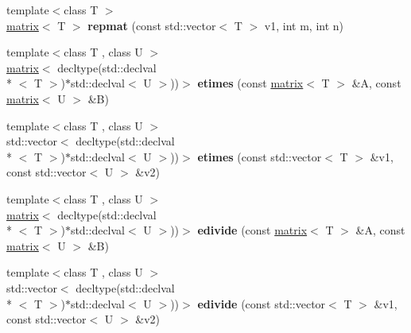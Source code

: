 \begin{DoxyCompactItemize}
\item 
\hypertarget{namespacekeycpp_a59fbea40dfc2d43cd338812f06c4f064}{{\footnotesize template$<$class T $>$ }\\\hyperlink{classkeycpp_1_1matrix}{matrix}$<$ T $>$ {\bfseries repmat} (const std\-::vector$<$ T $>$ v1, int m, int n)}\label{namespacekeycpp_a59fbea40dfc2d43cd338812f06c4f064}

\item 
\hypertarget{namespacekeycpp_a8272f1a2a2ecafa66bec7f1b3409d125}{{\footnotesize template$<$class T , class U $>$ }\\\hyperlink{classkeycpp_1_1matrix}{matrix}$<$ decltype(std\-::declval\\*
$<$ T $>$)$\ast$std\-::declval$<$ U $>$))$>$ {\bfseries etimes} (const \hyperlink{classkeycpp_1_1matrix}{matrix}$<$ T $>$ \&A, const \hyperlink{classkeycpp_1_1matrix}{matrix}$<$ U $>$ \&B)}\label{namespacekeycpp_a8272f1a2a2ecafa66bec7f1b3409d125}

\item 
\hypertarget{namespacekeycpp_a2d684d6c9ad5529ad7cb5437e1828fe2}{{\footnotesize template$<$class T , class U $>$ }\\std\-::vector$<$ decltype(std\-::declval\\*
$<$ T $>$)$\ast$std\-::declval$<$ U $>$))$>$ {\bfseries etimes} (const std\-::vector$<$ T $>$ \&v1, const std\-::vector$<$ U $>$ \&v2)}\label{namespacekeycpp_a2d684d6c9ad5529ad7cb5437e1828fe2}

\item 
\hypertarget{namespacekeycpp_aaa691889ea888335ae1f23c562dde80a}{{\footnotesize template$<$class T , class U $>$ }\\\hyperlink{classkeycpp_1_1matrix}{matrix}$<$ decltype(std\-::declval\\*
$<$ T $>$)$\ast$std\-::declval$<$ U $>$))$>$ {\bfseries edivide} (const \hyperlink{classkeycpp_1_1matrix}{matrix}$<$ T $>$ \&A, const \hyperlink{classkeycpp_1_1matrix}{matrix}$<$ U $>$ \&B)}\label{namespacekeycpp_aaa691889ea888335ae1f23c562dde80a}

\item 
\hypertarget{namespacekeycpp_ae276dd1d44dcc05d14618a2a9c4b1b21}{{\footnotesize template$<$class T , class U $>$ }\\std\-::vector$<$ decltype(std\-::declval\\*
$<$ T $>$)$\ast$std\-::declval$<$ U $>$))$>$ {\bfseries edivide} (const std\-::vector$<$ T $>$ \&v1, const std\-::vector$<$ U $>$ \&v2)}\label{namespacekeycpp_ae276dd1d44dcc05d14618a2a9c4b1b21}


\end{DoxyCompactItemize}
